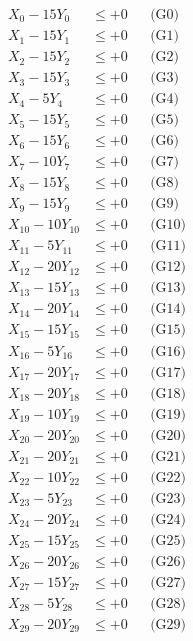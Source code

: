 \documentclass[a4paper,10pt]{article}
\begin{document}
\allowdisplaybreaks
{\small
\begin{align}
X_{0} - 15Y_{0} &\leq +0 && \text{(G0)} \\
X_{1} - 15Y_{1} &\leq +0 && \text{(G1)} \\
X_{2} - 15Y_{2} &\leq +0 && \text{(G2)} \\
X_{3} - 15Y_{3} &\leq +0 && \text{(G3)} \\
X_{4} - 5Y_{4} &\leq +0 && \text{(G4)} \\
X_{5} - 15Y_{5} &\leq +0 && \text{(G5)} \\
X_{6} - 15Y_{6} &\leq +0 && \text{(G6)} \\
X_{7} - 10Y_{7} &\leq +0 && \text{(G7)} \\
X_{8} - 15Y_{8} &\leq +0 && \text{(G8)} \\
X_{9} - 15Y_{9} &\leq +0 && \text{(G9)} \\
\allowbreak
X_{10} - 10Y_{10} &\leq +0 && \text{(G10)} \\
X_{11} - 5Y_{11} &\leq +0 && \text{(G11)} \\
X_{12} - 20Y_{12} &\leq +0 && \text{(G12)} \\
X_{13} - 15Y_{13} &\leq +0 && \text{(G13)} \\
X_{14} - 20Y_{14} &\leq +0 && \text{(G14)} \\
X_{15} - 15Y_{15} &\leq +0 && \text{(G15)} \\
X_{16} - 5Y_{16} &\leq +0 && \text{(G16)} \\
X_{17} - 20Y_{17} &\leq +0 && \text{(G17)} \\
X_{18} - 20Y_{18} &\leq +0 && \text{(G18)} \\
X_{19} - 10Y_{19} &\leq +0 && \text{(G19)} \\
\allowbreak
X_{20} - 20Y_{20} &\leq +0 && \text{(G20)} \\
X_{21} - 20Y_{21} &\leq +0 && \text{(G21)} \\
X_{22} - 10Y_{22} &\leq +0 && \text{(G22)} \\
X_{23} - 5Y_{23} &\leq +0 && \text{(G23)} \\
X_{24} - 20Y_{24} &\leq +0 && \text{(G24)} \\
X_{25} - 15Y_{25} &\leq +0 && \text{(G25)} \\
X_{26} - 20Y_{26} &\leq +0 && \text{(G26)} \\
X_{27} - 15Y_{27} &\leq +0 && \text{(G27)} \\
X_{28} - 5Y_{28} &\leq +0 && \text{(G28)} \\
X_{29} - 20Y_{29} &\leq +0 && \text{(G29)} \\

\end{align}}
\end{document}
